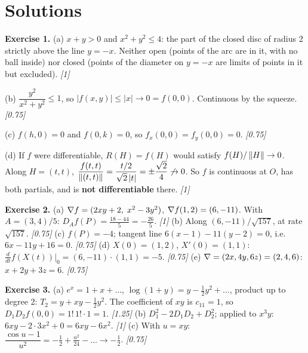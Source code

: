 \clearpage
\section*{Solutions}

\textbf{Exercise 1.}
(a) $x+y>0$ and $x^2+y^2\le4$: the part of the closed disc of radius 2 strictly above the line
$y=-x$. Neither open (points of the arc are in it, with no ball inside) nor closed (points of the
diameter on $y=-x$ are limits of points in it but excluded). \hfill\emph{[1]}

(b) $\dfrac{y^2}{x^2+y^2}\le1$, so $|f(x,y)|\le|x|\to0=f(0,0)$. Continuous by the squeeze. \hfill\emph{[0.75]}

(c) $f(h,0)=0$ and $f(0,k)=0$, so $f_x(0,0)=f_y(0,0)=0$. \hfill\emph{[0.75]}

(d) If $f$ were differentiable, $R(H)=f(H)$ would satisfy $f(H)/\left\lVert H\right\rVert\to0$. Along $H=(t,t)$,
$\dfrac{f(t,t)}{\left\lVert (t,t)\right\rVert}=\dfrac{t/2}{\sqrt2\,|t|}=\pm\dfrac{\sqrt2}{4}\not\to0$. So $f$ is
continuous at $O$, has both partials, and is \textbf{not differentiable} there. \hfill\emph{[1]}

\textbf{Exercise 2.}
(a) $\nabla f=(2xy+2,\;x^2-3y^2)$, $\nabla f(1,2)=(6,-11)$. With $A=(3,4)/5$:
$D_Af(P)=\frac{18-44}{5}=-\frac{26}{5}$. \hfill\emph{[1]}
(b) Along $(6,-11)/\sqrt{157}$, at rate $\sqrt{157}$. \hfill\emph{[0.75]}
(c) $f(P)=-4$; tangent line $6(x-1)-11(y-2)=0$, i.e.\ $6x-11y+16=0$. \hfill\emph{[0.75]}
(d) $X(0)=(1,2)$, $X'(0)=(1,1)$: $\frac{d}{dt}f(X(t))\big|_0=(6,-11)\cdot(1,1)=-5$. \hfill\emph{[0.75]}
(e) $\nabla=(2x,4y,6z)=(2,4,6)$: $x+2y+3z=6$. \hfill\emph{[0.75]}

\textbf{Exercise 3.}
(a) $e^x=1+x+\dots$, $\log(1+y)=y-\tfrac12y^2+\dots$, product up to degree 2:
$T_2=y+xy-\tfrac12y^2$. The coefficient of $xy$ is $c_{11}=1$, so $D_1D_2f(0,0)=1!\,1!\cdot1=1$. \hfill\emph{[1.25]}
(b) $D_1^2-2D_1D_2+D_2^2$; applied to $x^3y$: $6xy-2\cdot3x^2+0=6xy-6x^2$. \hfill\emph{[1]}
(c) With $u=xy$: $\dfrac{\cos u-1}{u^2}=-\tfrac12+\tfrac{u^2}{24}-\dots\to-\tfrac12$. \hfill\emph{[0.75]}

